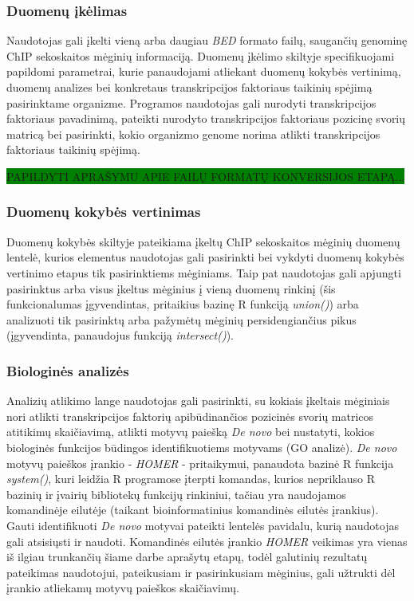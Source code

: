 \documentclass[12pt]{article}
\begin{document}
\subsubsection*{Duomenų įkėlimas}
Naudotojas gali įkelti vieną arba daugiau \emph{BED} formato failų, saugančių
genominę ChIP sekoskaitos mėginių informaciją. Duomenų įkėlimo skiltyje
specifikuojami papildomi parametrai, kurie panaudojami atliekant duomenų kokybės
vertinimą, duomenų analizes bei konkretaus transkripcijos faktoriaus taikinių
spėjimą pasirinktame organizme. Programos naudotojas gali nurodyti
transkripcijos faktoriaus pavadinimą, pateikti nurodyto transkripcijos
faktoriaus pozicinę svorių matricą bei pasirinkti, kokio organizmo genome
norima atlikti transkripcijos faktoriaus taikinių spėjimą.

\colorbox{green}{PAPILDYTI APRAŠYMU APIE FAILŲ FORMATŲ KONVERSIJOS ETAPĄ...}

\subsubsection*{Duomenų kokybės vertinimas}
Duomenų kokybės skiltyje pateikiama įkeltų ChIP sekoskaitos mėginių duomenų
lentelė, kurios elementus naudotojas gali pasirinkti bei vykdyti duomenų
kokybės vertinimo etapus tik pasirinktiems mėginiams. Taip pat naudotojas
gali apjungti pasirinktus arba visus įkeltus mėginius į vieną duomenų rinkinį
(šis funkcionalumas įgyvendintas, pritaikius bazinę R funkciją \emph{union()})
arba analizuoti tik pasirinktų arba pažymėtų mėginių persidengiančius pikus
(įgyvendinta, panaudojus funkciją \emph{intersect()}).

\subsubsection*{Biologinės analizės}
Analizių atlikimo lange naudotojas gali pasirinkti, su kokiais įkeltais
mėginiais nori atlikti transkripcijos faktorių apibūdinančios pozicinės
svorių matricos atitikimų skaičiavimą, atlikti motyvų paiešką \emph{De novo}
bei nustatyti, kokios biologinės funkcijos būdingos identifikuotiems motyvams
(GO analizė). \emph{De novo} motyvų paieškos įrankio - \emph{HOMER} -
pritaikymui, panaudota bazinė R funkcija \emph{system()}, kuri leidžia
R programose įterpti komandas, kurios nepriklauso R bazinių ir įvairių
bibliotekų funkcijų rinkiniui, tačiau yra naudojamos komandinėje eilutėje
(taikant bioinformatinius komandinės eilutės įrankius). Gauti identifikuoti
\emph{De novo} motyvai pateikti lentelės pavidalu, kurią naudotojas gali
atsisiųsti ir naudoti. Komandinės eilutės įrankio \emph{HOMER} veikimas yra
vienas iš ilgiau trunkančių šiame darbe aprašytų etapų, todėl galutinių
rezultatų pateikimas naudotojui, pateikusiam ir pasirinkusiam mėginius, gali
užtrukti dėl įrankio atliekamų motyvų paieškos skaičiavimų. 
\end{document}
